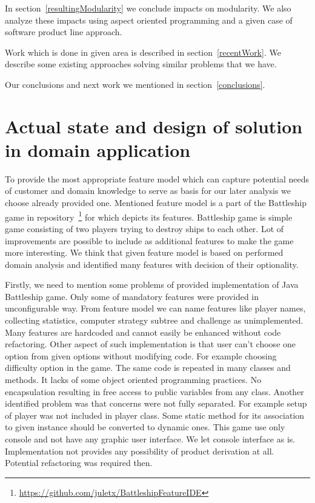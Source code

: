 \documentclass[11pt,slovak,a4paper,twoside]{article}
\begin{document}
In section~\ref{resultingModularity} we conclude impacts on modularity. We also analyze these impacts using aspect oriented programming and a given case of software product line approach.

Work which is done in given area is described in section~\ref{recentWork}. We describe some existing approaches solving similar problems that we have.

Our conclusions and next work we mentioned in section~\ref{conclusions}.

      
			
\section{Actual state and design of solution in domain application} \label{actualGameState}

To provide the most appropriate feature model which can capture potential needs of customer and domain knowledge to serve as basis for our later analysis we choose already provided one. Mentioned feature model is a part of the Battleship game in repository~\footnote{\url{https://github.com/juletx/BattleshipFeatureIDE}} for which depicts its features. Battleship game is simple game consisting of two players trying to destroy ships to each other. Lot of improvements are possible to include as additional features to make the game more interesting. We think that given feature model is based on performed domain analysis and identified many features with decision of their optionality.

Firstly, we need to mention some problems of provided implementation of Java Battleship game. Only some of mandatory features were provided in unconfigurable way. From feature model we can name features like player names, collecting statistics, computer strategy subtree and challenge as unimplemented. Many features are hardcoded and cannot easily be enhanced without code refactoring. Other aspect of such implementation is that user can't choose one option from given options without modifying code. For example choosing difficulty option in the game. The same code is repeated in many classes and methods. It lacks of some object oriented programming practices. No encapsulation resulting in free access to public variables from any class. Another identified problem was that concerns were not fully separated. For example setup of player was not included in player class. Some static method for its association to given instance should be converted to dynamic ones. This game use only console and not have any graphic user interface. We let console interface as is. Implementation not provides any possibility of product derivation at all. Potential refactoring was required then. 
\end{document}
